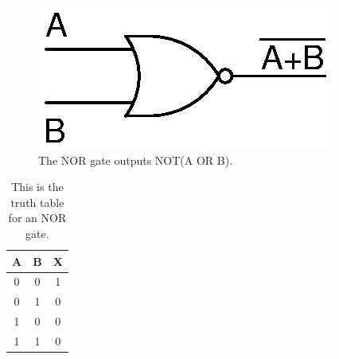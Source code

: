 \begin{figure}[!htb]
	\centering
	\includegraphics[scale=0.7]{logic/NOR.eps}
	\caption{The NOR gate outputs NOT(A OR B).}
	\label{fig:norgate}
\end{figure} 

\begin{table}[!ht]
	\centering
	\begin{tabular}{| c | c | c |}
		\hline
		A & B & X \\ 
		\hline
		0 & 0 & 1 \\ \hline
		0 & 1 & 0 \\ \hline
		1 & 0 & 0 \\ \hline
		1 & 1 & 0 \\ \hline
	\end{tabular}
	\caption{This is the truth table for an NOR gate.}
	\label{table:norgate}
\end{table}

